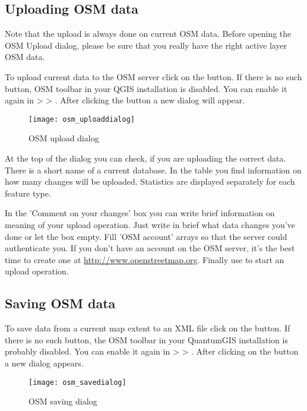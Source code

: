 \subsection{Uploading OSM data}  

Note that the upload is always done on current OSM data. Before opening the 
OSM Upload dialog, please be sure that you really have the right active 
layer ~ OSM data.

To upload current data to the OSM server click on the 
 button. If there is no such button, 
OSM toolbar in your QGIS installation is disabled. You can enable it 
again in  >  > 
. After clicking the  button a 
new dialog will appear.

\begin{figure}[ht]
   \centering
   \texttt{[image: osm\_uploaddialog]}
   \caption{OSM upload dialog \nixcaption}\label{fig:osmupload}
\end{figure}

At the top of the dialog you can check, if you are uploading the correct data. 
There is a short name of a current database. In the table you find information 
on how many changes will be uploaded. Statistics are displayed separately 
for each feature type.

In the 'Comment on your changes' box you can write brief information on 
meaning of your upload operation. Just write in brief what data changes 
you've done or let the box empty.
Fill 'OSM account' arrays so that the server could authenticate you. If 
you don't have an account on the OSM server, it's the best time to create 
one at \url{http://www.openstreetmap.org}. Finally use  to 
start an upload operation.

\subsection{Saving OSM data}  

To save data from a current map extent to an XML file click on the
 button. If there is no such button, 
the OSM toolbar in your QuantumGIS installation is probably disabled. You can 
enable it again in  >  >
. After clicking on the button a new dialog appears.

\begin{figure}[ht]
   \centering
   \texttt{[image: osm\_savedialog]}   
   \caption{OSM saving dialog \nixcaption}\label{fig:osmsave}
\end{figure}


